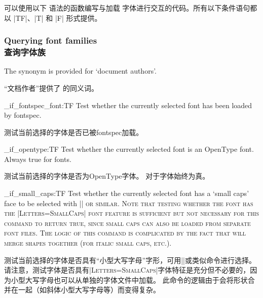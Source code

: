 \documentclass[a4paper]{l3doc}
\begin{document}
可以使用以下  语法的函数编写与加载  字体进行交互的代码。所有以下条件语句都以 |TF|、|T| 和 |F| 形式提供。

\subsubsection{Querying font families\\查询字体族}

The synonym  is provided for `document authors'.

“文档作者”提供了  的同义词。

\begin{macro}{\fontspec_if_fontspec_font:TF}
Test whether the currently selected font has been loaded by fontspec.

测试当前选择的字体是否已被fontspec加载。
\end{macro}


\begin{macro}{\fontspec_if_opentype:TF}
Test whether the currently selected font is an OpenType font.
Always true for \LuaTeX{} fonts.

测试当前选择的字体是否为OpenType字体。
对于\LuaTeX{}字体始终为真。
\end{macro}


\begin{macro}{\fontspec_if_small_caps:TF}
Test whether the currently selected font has a `small caps' face to be selected
with |\scshape| or similar.
Note that testing whether the font has the |Letters=SmallCaps| font feature is
sufficient but not necessary for this command to return true, since small caps
can also be loaded from separate font files.
The logic of this command is complicated by the fact that  will
merge shapes together (for italic small caps, etc.).

测试当前选择的字体是否具有“小型大写字母”字形，可用|\scshape|或类似命令进行选择。
请注意，测试字体是否具有|Letters=SmallCaps|字体特征是充分但不必要的，因为小型大写字母也可以从单独的字体文件中加载。
此命令的逻辑由于会将形状合并在一起（如斜体小型大写字母等）而变得复杂。
\end{macro}
\end{document}
